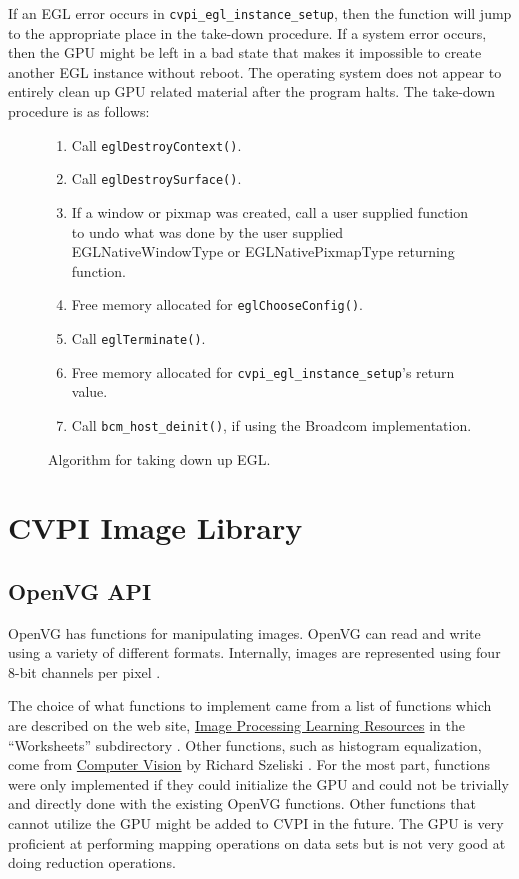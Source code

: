 \documentclass[12pt]{report}
\begin{document}
If an EGL error occurs in {\tt cvpi\_egl\_instance\_setup}, then the
function will jump to the appropriate place in the take-down
procedure. If a system error occurs, then the GPU might be left in a
bad state that makes it impossible to create another EGL instance
without reboot. The operating system does not appear to entirely clean
up GPU related material after the program halts. The take-down
procedure is as follows:
\begin{figure}[H]
\begin{mdframed}[style=default]
\begin{enumerate}
\item Call {\tt eglDestroyContext()}.
\item Call {\tt eglDestroySurface()}.
\item If a window or pixmap was created, call a user supplied
function to undo what was done by the user supplied
EGLNativeWindowType or EGLNativePixmapType returning function.
\item Free memory allocated for {\tt eglChooseConfig()}.
\item Call {\tt eglTerminate()}.
\item Free memory allocated for {\tt cvpi\_egl\_instance\_setup}'s
  return value.
\item Call {\tt bcm\_host\_deinit()}, if using the Broadcom implementation.
\end{enumerate}
\end{mdframed}
\caption{Algorithm for taking down up EGL.}
\end{figure}
\chapter{CVPI Image Library}
\label{sec-3}
\section{OpenVG API}
\label{sec-3-1}
OpenVG has functions for manipulating images. OpenVG can read and
write using a variety of different formats. Internally, images are
represented using four 8-bit channels per pixel \cite{openvg}.

The choice of what functions to implement came from a list of
functions which are described on the web site, \underline{Image
  Processing Learning Resources} in the ``Worksheets'' subdirectory
\cite{HIPR2}. Other functions, such as histogram equalization, come
from \underline{Computer Vision} by Richard Szeliski
\cite{Szeliski}. For the most part, functions were only implemented if
they could initialize the GPU and could not be trivially and directly
done with the existing OpenVG functions. Other functions that cannot
utilize the GPU might be added to CVPI in the future. The GPU is very
proficient at performing mapping operations on data sets but is not
very good at doing reduction operations.
\end{document}
